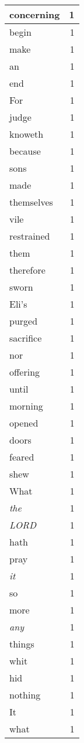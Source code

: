 \begin{center}
\begin{longtable}{l|r}
concerning & 1 \\ \hline
begin & 1 \\ \hline
make & 1 \\ \hline
an & 1 \\ \hline
end & 1 \\ \hline
For & 1 \\ \hline
judge & 1 \\ \hline
knoweth & 1 \\ \hline
because & 1 \\ \hline
sons & 1 \\ \hline
made & 1 \\ \hline
themselves & 1 \\ \hline
vile & 1 \\ \hline
restrained & 1 \\ \hline
them & 1 \\ \hline
therefore & 1 \\ \hline
sworn & 1 \\ \hline
Eli's & 1 \\ \hline
purged & 1 \\ \hline
sacrifice & 1 \\ \hline
nor & 1 \\ \hline
offering & 1 \\ \hline
until & 1 \\ \hline
morning & 1 \\ \hline
opened & 1 \\ \hline
doors & 1 \\ \hline
feared & 1 \\ \hline
shew & 1 \\ \hline
What & 1 \\ \hline
\emph{the} & 1 \\ \hline
\emph{LORD} & 1 \\ \hline
hath & 1 \\ \hline
pray & 1 \\ \hline
\emph{it} & 1 \\ \hline
so & 1 \\ \hline
more & 1 \\ \hline
\emph{any} & 1 \\ \hline
things & 1 \\ \hline
whit & 1 \\ \hline
hid & 1 \\ \hline
nothing & 1 \\ \hline
It & 1 \\ \hline
what & 1 \\ \hline

\end{longtable}
\end{center}
